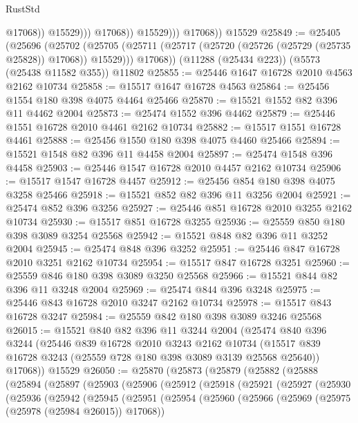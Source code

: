 \begin{lexlean}{RustStd}
\begin{coremodule}
                            @17068))
                        @15529)))
                  @17068))
              @15529)))
        @17068))
    @15529
@25849 := @25405
    (@25696
      (@25702
        (@25705 (@25711 (@25717 (@25720 (@25726 (@25729 (@25735 @25828)) @17068)) @15529)))
        @17068))
    (@11288 (@25434 @223))
    (@5573 (@25438 @11582 @355))
    @11802
@25855 := @25446 @1647 @16728 @2010 @4563 @2162 @10734
@25858 := @15517 @1647 @16728 @4563
@25864 := @25456 @1554 @180 @398 @4075 @4464 @25466
@25870 := @15521 @1552 @82 @396 @11 @4462 @2004
@25873 := @25474 @1552 @396 @4462
@25879 := @25446 @1551 @16728 @2010 @4461 @2162 @10734
@25882 := @15517 @1551 @16728 @4461
@25888 := @25456 @1550 @180 @398 @4075 @4460 @25466
@25894 := @15521 @1548 @82 @396 @11 @4458 @2004
@25897 := @25474 @1548 @396 @4458
@25903 := @25446 @1547 @16728 @2010 @4457 @2162 @10734
@25906 := @15517 @1547 @16728 @4457
@25912 := @25456 @854 @180 @398 @4075 @3258 @25466
@25918 := @15521 @852 @82 @396 @11 @3256 @2004
@25921 := @25474 @852 @396 @3256
@25927 := @25446 @851 @16728 @2010 @3255 @2162 @10734
@25930 := @15517 @851 @16728 @3255
@25936 := @25559 @850 @180 @398 @3089 @3254 @25568
@25942 := @15521 @848 @82 @396 @11 @3252 @2004
@25945 := @25474 @848 @396 @3252
@25951 := @25446 @847 @16728 @2010 @3251 @2162 @10734
@25954 := @15517 @847 @16728 @3251
@25960 := @25559 @846 @180 @398 @3089 @3250 @25568
@25966 := @15521 @844 @82 @396 @11 @3248 @2004
@25969 := @25474 @844 @396 @3248
@25975 := @25446 @843 @16728 @2010 @3247 @2162 @10734
@25978 := @15517 @843 @16728 @3247
@25984 := @25559 @842 @180 @398 @3089 @3246 @25568
@26015 := @15521
    @840
    @82
    @396
    @11
    @3244
    @2004
    (@25474
      @840
      @396
      @3244
      (@25446
        @839
        @16728
        @2010
        @3243
        @2162
        @10734
        (@15517 @839 @16728 @3243 (@25559 @728 @180 @398 @3089 @3139 @25568 @25640))
        @17068))
    @15529
@26050 := @25870
    (@25873
      (@25879
        (@25882
          (@25888
            (@25894
              (@25897
                (@25903
                  (@25906
                    (@25912
                      (@25918
                        (@25921
                          (@25927
                            (@25930
                              (@25936
                                (@25942
                                  (@25945
                                    (@25951
                                      (@25954
                                        (@25960
                                          (@25966
                                            (@25969 (@25975 (@25978 (@25984 @26015)) @17068))

\end{coremodule}
\end{lexlean}
